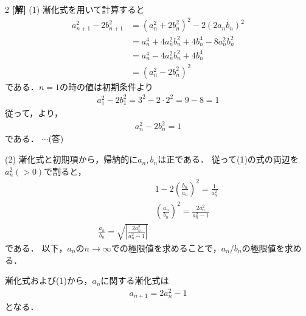 \documentclass[../../../../main.tex]{subfiles}
\begin{document}
\setcounter{equation}{0}
\begin{oframed}
    
\end{oframed}
\setlength{\columnseprule}{0.4pt}
\begin{multicols}{2}
    {\bf[解]}
    (1)
    漸化式を用いて計算すると
    \begin{align}
        a_{n+1}^2 - 2b_{n+1}^2
         & = (a_n^2 + 2b_n^2)^2 - 2(2a_n b_n)^2           \\
         & = a_n^4 + 4a_n^2 b_n^2 + 4b_n^4 - 8a_n^2 b_n^2 \\
         & = a_n^4 - 4a_n^2 b_n^2 + 4b_n^4                \\
         & = (a_n^2 - 2b_n^2)^2\label{2002-5:eq:1}
    \end{align}
    である．$n=1$の時の値は初期条件より
    \begin{align}
        a_1^2 - 2b_1^2 = 3^2 - 2 \cdot 2^2 = 9 - 8 = 1 \label{2002-5:eq:2}
    \end{align}
    従って，\label{2002-5:eq:1,2002-5:eq:2}より，
    \begin{align*}
        a_n^2 - 2b_n^2 = 1
    \end{align*}
    である． $\cdots$(答)

    \vspace{10pt}
    (2)
    漸化式と初期項から，帰納的に$a_n, b_n$は正である．
    従って(1)の式の両辺を$a^2_n(>0)$で割ると，
    \begin{align}
         & 1 - 2\left(\frac{b_n}{a_n}\right)^2 = \frac{1}{a_n^2}   \\
         & \left(\frac{a_n}{b_n}\right)^2 = \frac{2a^2_n}{a^2_n-1} \\
        \frac{a_n}{b_n} = \sqrt{\left|\frac{2a^2_n}{a^2_n-1}\right|} \label{2002-5:eq:4}
    \end{align}
    である．
    以下，$a_n$の$n\to\infty$での極限値を求めることで，$a_n/b_n$の極限値を求める．

    漸化式および(1)から，$a_n$に関する漸化式は
    \begin{align}
        a_{n+1} = 2a_n^2  - 1 \label{2002-5:eq:3}
    \end{align}
    となる．


\end{multicols}
\end{document}
